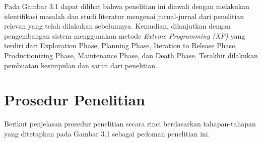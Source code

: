 Pada Gambar 3.1 dapat dilihat bahwa penelitian ini diawali dengan melakukan identifikasi masalah dan studi literatur mengenai jurnal-jurnal dari penelitian relevan yang telah dilakukan sebelumnya. Kemudian, dilanjutkan dengan pengembangan sistem menggunakan metode \textit{Exteme Programming (XP)} yang terdiri dari Exploration Phase, Planning Phase, Iteration to Release Phase, Productionizing Phase, Maintenance Phase, dan Death Phase. Terakhir dilakukan pembuatan kesimpulan dan saran dari penelitian.

\section{Prosedur Penelitian}

\noindent Berikut penjelasan prosedur penelitian secara rinci berdasarkan tahapan-tahapan yang ditetapkan pada Gambar 3.1 sebagai pedoman penelitian ini.

\newpage


